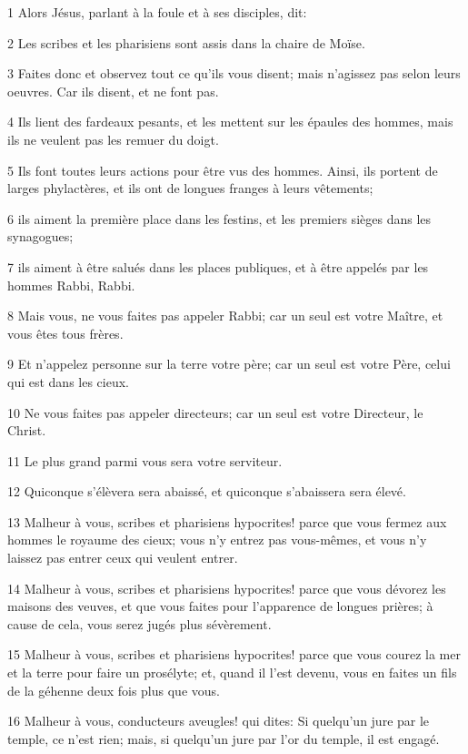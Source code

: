 \par 1 Alors Jésus, parlant à la foule et à ses disciples, dit:
\par 2 Les scribes et les pharisiens sont assis dans la chaire de Moïse.
\par 3 Faites donc et observez tout ce qu'ils vous disent; mais n'agissez pas selon leurs oeuvres. Car ils disent, et ne font pas.
\par 4 Ils lient des fardeaux pesants, et les mettent sur les épaules des hommes, mais ils ne veulent pas les remuer du doigt.
\par 5 Ils font toutes leurs actions pour être vus des hommes. Ainsi, ils portent de larges phylactères, et ils ont de longues franges à leurs vêtements;
\par 6 ils aiment la première place dans les festins, et les premiers sièges dans les synagogues;
\par 7 ils aiment à être salués dans les places publiques, et à être appelés par les hommes Rabbi, Rabbi.
\par 8 Mais vous, ne vous faites pas appeler Rabbi; car un seul est votre Maître, et vous êtes tous frères.
\par 9 Et n'appelez personne sur la terre votre père; car un seul est votre Père, celui qui est dans les cieux.
\par 10 Ne vous faites pas appeler directeurs; car un seul est votre Directeur, le Christ.
\par 11 Le plus grand parmi vous sera votre serviteur.
\par 12 Quiconque s'élèvera sera abaissé, et quiconque s'abaissera sera élevé.
\par 13 Malheur à vous, scribes et pharisiens hypocrites! parce que vous fermez aux hommes le royaume des cieux; vous n'y entrez pas vous-mêmes, et vous n'y laissez pas entrer ceux qui veulent entrer.
\par 14 Malheur à vous, scribes et pharisiens hypocrites! parce que vous dévorez les maisons des veuves, et que vous faites pour l'apparence de longues prières; à cause de cela, vous serez jugés plus sévèrement.
\par 15 Malheur à vous, scribes et pharisiens hypocrites! parce que vous courez la mer et la terre pour faire un prosélyte; et, quand il l'est devenu, vous en faites un fils de la géhenne deux fois plus que vous.
\par 16 Malheur à vous, conducteurs aveugles! qui dites: Si quelqu'un jure par le temple, ce n'est rien; mais, si quelqu'un jure par l'or du temple, il est engagé.
